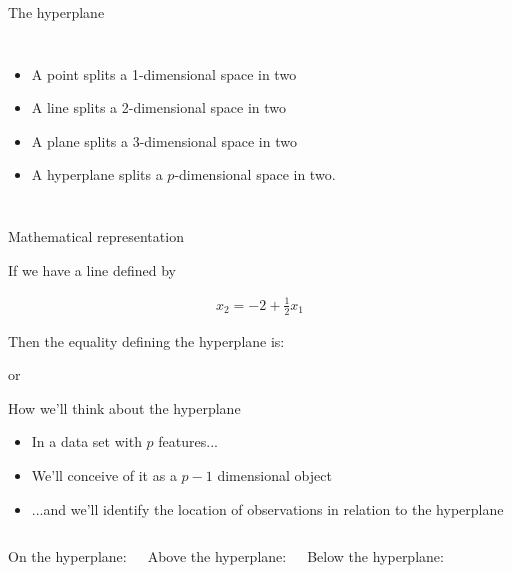 \documentclass[mathserif, aspectratio=169]{beamer}
\begin{document}
\begin{frame}{The hyperplane}
\begin{columns}
\begin{itemize}
\item A point splits a 1-dimensional space in two
\vspace{5mm}
\item A line splits a 2-dimensional space in two
\vspace{5mm}
\item A plane splits a 3-dimensional space in two
\vspace{5mm}
\item A hyperplane splits a $p$-dimensional space in two.  
\end{itemize}

\end{columns}
\end{frame}

\begin{frame}{Mathematical representation}

If we have a line defined by

\begin{align*}
x_2 = -2+\frac{1}{2} x_1
\end{align*}

Then the equality defining the hyperplane is:

\vspace{15mm}
or

\vspace{15mm}
\end{frame}

\begin{frame}{How we'll think about the hyperplane}

\begin{itemize}
\item In a data set with $p$ features...
\item We'll conceive of it as a $p-1$ dimensional object 
\item ...and we'll identify the location of observations in relation to the hyperplane
\end{itemize}

\vspace{10mm}
\begin{columns}

On the hyperplane:
\vspace{10mm}

Above the hyperplane:
\vspace{10mm}

Below the hyperplane:
\end{columns}
\end{frame}
\end{document}
